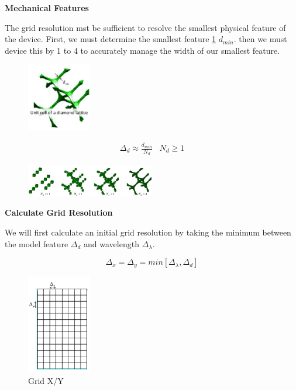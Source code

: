 \documentclass[a4paper,10pt]{article}
\begin{document}
\textbf{Mechanical Features}

The grid resolution mst be sufficient to resolve the smallest physical feature of the device.  First, we must determine the smallest feature \ref{fig:diamondlattice} $d_{min}$.  then we must device this by 1 to 4 to accurately manage the width of our smallest feature.  
\begin{figure}[ht]
  \label{fig:diamondlattice}
   \centering
     \includegraphics[width=0.25\textwidth]{DiamondLattice.png}
   \caption{}
\end{figure}



\begin{eqnarray*}
 \Delta_d \approx \frac{d_{min}}{N_d} & N_d \geq 1
\end{eqnarray*}

\begin{figure}[ht]
  \label{fig:diamondlatticebuildup}
   \centering
     \includegraphics[width=0.5\textwidth]{DiamondLatticeBuildup.png}
   \caption{}
\end{figure}

\textbf{Calculate Grid Resolution}

We will first calculate an initial grid resolution by taking the minimum between the model feature $\Delta_d$ and wavelength $\Delta_\lambda$.

\begin{equation*}
   \Delta_x = \Delta_y = min[\Delta_\lambda,\Delta_d]
\end{equation*}



\begin{figure}[ht]
  \label{fig:Gridxy}
   \centering
     \includegraphics[width=0.25\textwidth]{Gridxy.png}
   \caption{Grid X/Y}
\end{figure}
\end{document}
